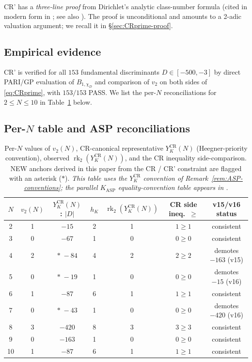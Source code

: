 \documentclass[11pt,a4paper,reqno]{amsart}
\theoremstyle{definition}
\DeclareMathOperator{\rk}{rk}
\newcommand{\KASP}{K_{\mathrm{ASP}}}
\newcommand{\YKCR}{Y_K^{\mathrm{CR}}}
\newcommand{\vtwo}{v_2}
\begin{document}
CR' has a \emph{three-line proof} from Dirichlet's analytic class-number
formula \cite{Dirichlet1839} (cited in modern form in \cite[Thm.~4.9.5]{Davenport2000}; see also \cite[\S 7.B]{Cox1989}). The proof is unconditional
and amounts to a 2-adic valuation argument; we recall it in \S\ref{sec:CRprime-proof}.

\subsection{Empirical evidence}\label{ss:empirics}

CR' is verified for all $153$ fundamental discriminants $D \in [-500, -3]$
by direct PARI/GP evaluation of $B_{1,\chi_D}$ and comparison of $\vtwo$ on
both sides of \eqref{eq:CRprime}, with $153/153$ PASS. We list the per-$N$
reconciliations for $2\le N\le 10$ in Table~\ref{tab:perN} below.

\subsection{Per-$N$ table and ASP reconciliations}\label{ss:perN}

\begin{table}[h]
\caption{Per-$N$ values of $\vtwo(N)$, CR-canonical representative
$\YKCR(N)$ (Heegner-priority convention), observed
$\rk_2(\YKCR(N))$, and the CR inequality side-comparison. NEW anchors derived
in this paper from the CR / CR' constraint are flagged with an asterisk
($\ast$). \emph{This table uses the $\YKCR$ convention of
Remark~\ref{rem:ASP-conventions}; the parallel $\KASP$ equality-convention
table appears in \cite{Remondiere2026KASPmini}.}}\label{tab:perN}
\begin{center}
\begin{tabular}{ccccccc}
\toprule
$N$ & $\vtwo(N)$ & $\YKCR(N)$ : $|D|$ & $h_K$ & $\rk_2(\YKCR(N))$ & CR side ineq.~$\ge$ & v15/v16 status \\
\midrule
2  & 1 & $-15$    & 2 & 1 & $1 \ge 1$ & consistent \\
3  & 0 & $-67$    & 1 & 0 & $0 \ge 0$ & consistent \\
4  & 2 & $\ast\;-84$ & 4 & 2 & $2 \ge 2$ & demotes $-163$ (v15) \\
5  & 0 & $\ast\;-19$ & 1 & 0 & $0 \ge 0$ & demotes $-15$ (v16) \\
6  & 1 & $-87$    & 6 & 1 & $1 \ge 1$ & consistent \\
7  & 0 & $\ast\;-43$ & 1 & 0 & $0 \ge 0$ & demotes $-420$ (v16) \\
8  & 3 & $-420$   & 8 & 3 & $3 \ge 3$ & consistent \\
9  & 0 & $-163$   & 1 & 0 & $0 \ge 0$ & consistent \\
10 & 1 & $-87$    & 6 & 1 & $1 \ge 1$ & consistent \\
\bottomrule
\end{tabular}
\end{center}
\end{table}
\end{document}
